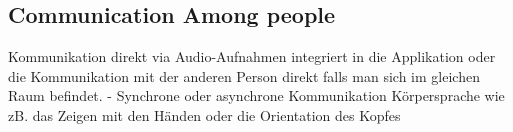 \subsection{Communication Among people}

Kommunikation direkt via Audio-Aufnahmen integriert in die Applikation oder die Kommunikation mit der anderen Person direkt falls man sich im gleichen Raum befindet.
-	Synchrone oder asynchrone Kommunikation
Körpersprache wie zB. das Zeigen mit den Händen oder die Orientation des Kopfes
